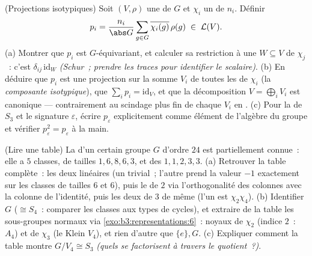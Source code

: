 \begin{exercise}[$\star\star$]\label{exo:b3:representations:11}
(Projections isotypiques) Soit $(V, \rho)$ une  de
$G$ et $\chi_i$ un   de  $n_i$.
Définir
\[
p_i = \frac{n_i}{\abs G}\sum_{g\in G}
\overline{\chi_i(g)}\,\rho(g) \;\in\; \mathcal L(V).
\]
(a) Montrer que $p_i$ est $G$-équivariant, et calculer sa
restriction à une   $W
\subseteq V$ de  $\chi_j$~: c'est $\delta_{ij}\,
\mathrm{id}_W$ \emph{(Schur~; prendre les traces pour
identifier le scalaire)}.
(b) En déduire que $p_i$ est une projection sur la somme $V_i$
de toutes les   de 
$\chi_i$ (la \emph{composante isotypique}), que $\sum_ip_i =
\mathrm{id}_V$, et que la décomposition $V = \bigoplus_iV_i$
est canonique --- contrairement au scindage plus fin de chaque
$V_i$ en .
(c) Pour la  de $S_3$ et le 
signature $\varepsilon$, écrire $p_\varepsilon$ explicitement
comme élément de l'algèbre du groupe et vérifier
$p_\varepsilon^2 = p_\varepsilon$ à la main.
\end{exercise}

\begin{exercise}[$\star\star$]\label{exo:b3:representations:12}
(Lire une table) La  d'un certain groupe $G$
d'ordre $24$ est partiellement connue~: elle a $5$ classes, de
tailles $1, 6, 8, 6, 3$, et des  $1, 1, 2, 3, 3$.
(a) Retrouver la table complète~: les deux  linéaires
(un trivial~; l'autre prend la valeur $-1$ exactement sur les
classes de tailles $6$ et $6$), puis le  de  $2$
via l'orthogonalité des colonnes avec la colonne de l'identité,
puis les deux  de  $3$ de même (l'un est
$\chi_2\chi_4$).
(b) Identifier $G$ ($\cong S_4$~: comparer les classes aux
types de cycles), et extraire de la table les sous-groupes
normaux via \cref{exo:b3:representations:6}~: noyaux de $\chi_2$
(indice $2$~: $A_4$) et de $\chi_3$ (le Klein $V_4$), et rien
d'autre que $\{e\}, G$.
(c) Expliquer comment la table montre $G/V_4 \cong S_3$
\emph{(quels  se factorisent à travers le
quotient~?)}.
\end{exercise}

